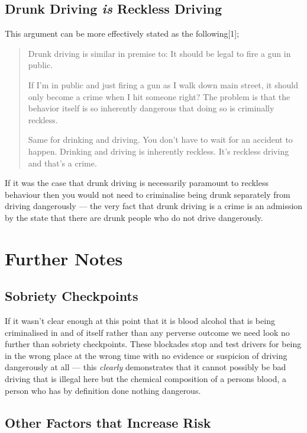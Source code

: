 \documentclass[11pt]{article}
\begin{document}
\subsection{Drunk Driving \emph{is} Reckless Driving}
\label{sec:orga189747}

This argument can be more effectively stated as the following[1];

\begin{quote}
Drunk driving is similar in premise to: It should be legal to fire a gun in public.

If I'm in public and just firing a gun as I walk down main street, it should only become a crime when I hit someone right? The problem is that the behavior itself is so inherently dangerous that doing so is criminally reckless.

Same for drinking and driving. You don't have to wait for an accident to happen. Drinking and driving is inherently reckless. It's reckless driving and that's a crime.
\end{quote}

If it was the case that drunk driving is necessarily paramount to reckless behaviour then you would not need to criminalise being drunk separately from driving dangerously --- the very fact that drunk driving is a crime is an admission by the state that there are drunk people who do not drive dangerously.


\section{Further Notes}
\label{sec:org56155ac}

\subsection{Sobriety Checkpoints}
\label{sec:org6bd7c36}

If it wasn't clear enough at this point that it is blood alcohol that is being criminalised in and of itself rather than any perverse outcome we need look no further than sobriety checkpoints. These blockades stop and test drivers for being in the wrong place at the wrong time with no evidence or suspicion of driving dangerously at all --- this \emph{clearly} demonstrates that it cannot possibly be bad driving that is illegal here but the chemical composition of a persons blood, a person who has by definition done nothing dangerous.


\subsection{Other Factors that Increase Risk}
\label{sec:orgd0ed119}
\end{document}
